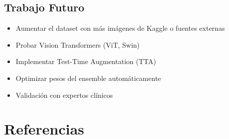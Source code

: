 \documentclass[12pt,a4paper]{article}
\begin{document}
\subsection{Trabajo Futuro}

\begin{itemize}
    \item Aumentar el dataset con más imágenes de Kaggle o fuentes externas
    \item Probar Vision Transformers (ViT, Swin)
    \item Implementar Test-Time Augmentation (TTA)
    \item Optimizar pesos del ensemble automáticamente
    \item Validación con expertos clínicos
\end{itemize}

\newpage

\section*{Referencias}
\newpage


\end{document}
